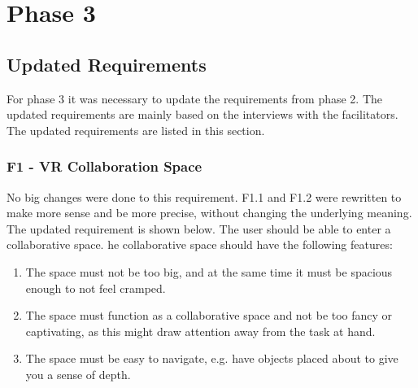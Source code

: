\chapter{Phase 3}
    \section{Updated Requirements} %
    For phase 3 it was necessary to update the requirements from phase 2. The updated requirements are mainly based on the interviews with the facilitators. The updated requirements are listed in this section.
    
        \subsection{F1 - VR Collaboration Space} %
        No big changes were done to this requirement. F1.1 and F1.2 were rewritten to make more sense and be more precise, without changing the underlying meaning. The updated requirement is shown below.
        \newline\newline
        The user should be able to enter a collaborative space. he collaborative space should have the following features:
        \begin{enumerate}
            \item The space must not be too big, and at the same time it must be spacious enough to not feel cramped.
            \item The space must function as a collaborative space and not be too fancy or captivating, as this might draw attention away from the task at hand.
            \item The space must be easy to navigate, e.g. have objects placed about to give you a sense of depth.
        \end{enumerate}
        
